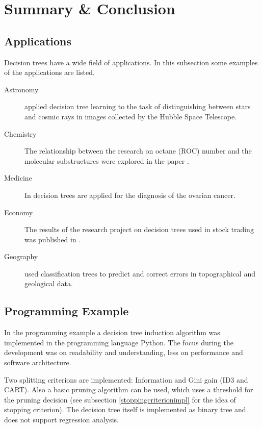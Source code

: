 
\newpage


\section{Summary \& Conclusion}

\subsection{Applications}

Decision trees have a wide field of applications. In this subsection some examples of the applications are listed.

\begin{description}
    \item[Astronomy] \cite{salzberg1995decision} applied decision tree learning to the task of distinguishing between stars and cosmic rays in images collected by the Hubble Space Telescope.
    \item[Chemistry] The relationship between the research on octane (ROC) number and the molecular substructures were explored in the paper \cite{blurock1995automatic}.
    \item[Medicine] In \cite{vlahou2003diagnosis} decision trees are applied for the diagnosis of the ovarian cancer.     
    \item[Economy] The results of the research project on decision trees used in stock trading was published in \cite{wu2006effective}.
    \item[Geography] \cite{lagacherie1997addressing} used classification trees to predict and correct errors in topographical and geological data.
\end{description}



\subsection{Programming Example}

In the programming example a decision tree induction algorithm was implemented in the programming language Python. The focus during the development was on readability and understanding, less on performance and software architecture. 

Two splitting criterions are implemented: Information and Gini gain (ID3 and CART). Also a basic pruning algorithm can be used, which uses a threshold for the pruning decision (see subsection \ref{stoppingcriterionimpl} for the idea of stopping criterion). The decision tree itself is implemented as binary tree and does not support regression analysis.

